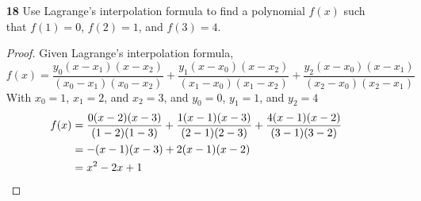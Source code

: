 \documentclass[paper=usletter, fontsize=12pt]{article}
\begin{document}
\begin{itemize}
\begin{enumerate}
\begin{proof}
            \end{proof}

            \item[\textbf{18}] Use Lagrange's interpolation formula to find a
            polynomial $f(x)$ such that $f(1)=0$, $f(2)=1$, and $f(3)=4$.
            \begin{proof}

                Given Lagrange's interpolation formula,
                \begin{equation*}
                    f(x)=\frac{y_0(x-x_1)(x-x_2)}{(x_0-x_1)(x_0-x_2)}+\frac{y_1(x-x_0)(x-x_2)}{(x_1-x_0)(x_1-x_2)}+\frac{y_2(x-x_0)(x-x_1)}{(x_2-x_0)(x_2-x_1)}
                \end{equation*}
                With $x_0=1$, $x_1=2$, and $x_2=3$, and $y_0=0$, $y_1=1$, and $y_2=4$\\
                \begin{align*}
                    f(x)&=\frac{0(x-2)(x-3)}{(1-2)(1-3)}+\frac{1(x-1)(x-3)}{(2-1)(2-3)}+\frac{4(x-1)(x-2)}{(3-1)(3-2)}\\
                    &=-(x-1)(x-3)+2(x-1)(x-2)\\
                    &=x^2-2x+1 \qedhere
                \end{align*}

            \end{proof}

        \end{enumerate}

    \end{itemize}
\end{document}
